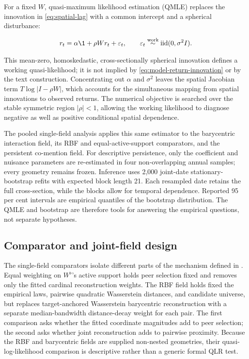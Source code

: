 For a fixed $W$, quasi-maximum likelihood estimation (QMLE) replaces the
innovation in \eqref{eq:spatial-lag} with a common intercept and a spherical
disturbance:

\[
  r_t=\alpha\1+\rho W r_t+\varepsilon_t,
  \qquad \varepsilon_t\mathrel{\overset{\mathrm{work}}{\sim}}
  \mathrm{iid}(0,\sigma^2I).
\]

This mean-zero, homoskedastic, cross-sectionally spherical innovation defines a
working quasi-likelihood; it is not implied by
\eqref{eq:model-return-innovation} or by the text construction.
Concentrating out $\alpha$ and $\sigma^2$ leaves the spatial Jacobian term
$T\log|I-\rho W|$, which accounts for the simultaneous mapping from spatial
innovations to observed returns.
The numerical objective is searched over the stable symmetric region
$|\rho|<1$, allowing the working likelihood to diagnose negative as well as
positive conditional spatial dependence.

The pooled single-field analysis applies this same estimator to the barycentric
interaction field, its RBF and equal-active-support comparators, and the
persistent co-mention field.
For descriptive persistence, only the coefficient and nuisance parameters are
re-estimated in four non-overlapping annual samples; every geometry remains
frozen.
Inference uses 2,000 joint-date stationary-bootstrap refits with expected block
length 21.
Each resampled date retains the full cross-section, while the blocks allow for
temporal dependence.
Reported 95 per cent intervals are empirical quantiles of the bootstrap
distribution.
The QMLE and bootstrap are therefore tools for answering the empirical
questions, not separate hypotheses.

\subsection{Comparator and joint-field design}
\label{sec:two-field-estimation}

The single-field comparators isolate different parts of the mechanism defined
in .
Equal weighting on $W^\flat$'s active support holds peer selection fixed and
removes only the fitted cardinal reconstruction weights.
The RBF field holds fixed the empirical laws, pairwise quadratic Wasserstein
distances, and candidate universe, but replaces target-anchored
Wasserstein barycentric reconstruction with a separate median-bandwidth
distance-decay weight for each pair.
The first comparison asks whether the fitted coordinate magnitudes add to peer
selection; the second asks whether joint reconstruction adds to pairwise
proximity.
Because the RBF and barycentric fields are supplied non-nested geometries, their
quasi-log-likelihood comparison is descriptive rather than a generic formal
QLR test.

